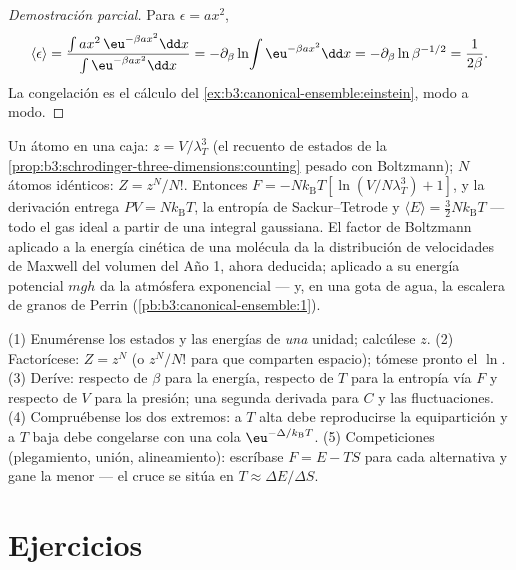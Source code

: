 \begin{proof}[Demostración parcial]
Para $\epsilon = ax^2$,
\[
\langle\epsilon\rangle
 = \frac{\int ax^2\,\eu^{-\beta ax^2}\dd x}
        {\int\eu^{-\beta ax^2}\dd x}
 = -\partial_\beta\ln\!\int\eu^{-\beta ax^2}\dd x
 = -\partial_\beta\ln\beta^{-1/2} = \frac{1}{2\beta} .
\] La congelación es el cálculo del
\cref{ex:b3:canonical-ensemble:einstein}, modo a
modo.
\end{proof}

\begin{example}\label{ex:b3:canonical-ensemble:gas}
Un átomo en una caja: $z = V/\lambda_T^3$ (el recuento de estados de la
\cref{prop:b3:schrodinger-three-dimensions:counting} pesado con
Boltzmann); $N$ átomos idénticos: $Z = z^N/N!$. Entonces $F =
-Nk_{\text{B}}T[\ln(V/N\lambda_T^3) + 1]$, y la derivación
entrega $PV = Nk_{\text{B}}T$, la entropía de Sackur--Tetrode y
$\langle E\rangle = \tfrac32 Nk_{\text{B}}T$ --- todo el gas ideal
a partir de una integral gaussiana. El factor de Boltzmann aplicado a la
energía cinética de una molécula da la distribución de velocidades de
Maxwell del volumen del Año 1, ahora deducida; aplicado a su energía
potencial $mgh$ da la atmósfera exponencial --- y, en una gota de
agua, la escalera de granos de Perrin
(\cref{pb:b3:canonical-ensemble:1}).
\end{example}

\begin{method}\label{met:b3:canonical-ensemble:method}
(1) Enumérense los estados y las energías de \emph{una} unidad; calcúlese $z$.
(2) Factorícese: $Z = z^N$ (o $z^N/N!$ para 
que comparten espacio); tómese pronto el $\ln$. (3) Deríve: respecto de
$\beta$ para la energía, respecto de $T$ para la entropía vía $F$ y
respecto de $V$ para la presión; una segunda derivada para $C$ y las
fluctuaciones. (4) Compruébense los dos extremos: a $T$ alta debe
reproducirse la equipartición y a $T$ baja debe congelarse con una cola
$\eu^{-\Delta/k_{\text{B}}T}$. (5) Competiciones (plegamiento,
unión, alineamiento): escríbase $F = E - TS$ para cada alternativa y
gane la menor --- el cruce se sitúa en $T \approx \Delta
E/\Delta S$.
\end{method}

\section{Ejercicios}


